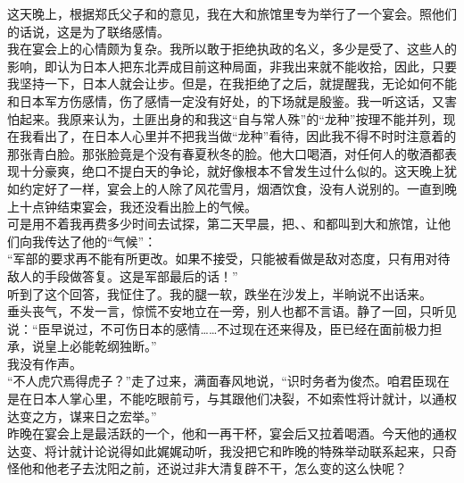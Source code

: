 这天晚上，根据郑氏父子和的意见，我在大和旅馆里专为举行了一个宴会。照他们的话说，这是为了联络感情。\\

我在宴会上的心情颇为复杂。我所以敢于拒绝执政的名义，多少是受了、这些人的影响，即认为日本人把东北弄成目前这种局面，非我出来就不能收拾，因此，只要我坚持一下，日本人就会让步。但是，在我拒绝了之后，就提醒我，无论如何不能和日本军方伤感情，伤了感情一定没有好处，的下场就是殷鉴。我一听这话，又害怕起来。我原来认为，土匪出身的和我这“自与常人殊”的“龙种”按理不能并列，现在我看出了，在日本人心里并不把我当做“龙种”看待，因此我不得不时时注意着的那张青白脸。那张脸竟是个没有春夏秋冬的脸。他大口喝酒，对任何人的敬酒都表现十分豪爽，绝口不提白天的争论，就好像根本不曾发生过什么似的。这天晚上犹如约定好了一样，宴会上的人除了风花雪月，烟酒饮食，没有人说别的。一直到晚上十点钟结束宴会，我还没看出脸上的气候。\\

可是用不着我再费多少时间去试探，第二天早晨，把、、和都叫到大和旅馆，让他们向我传达了他的“气候”：\\

“军部的要求再不能有所更改。如果不接受，只能被看做是敌对态度，只有用对待敌人的手段做答复。这是军部最后的话！”\\

听到了这个回答，我怔住了。我的腿一软，跌坐在沙发上，半晌说不出话来。\\

垂头丧气，不发一言，惊慌不安地立在一旁，别人也都不言语。静了一回，只听见说：“臣早说过，不可伤日本的感情……不过现在还来得及，臣已经在面前极力担承，说皇上必能乾纲独断。”\\

我没有作声。\\

“不人虎穴焉得虎子？”走了过来，满面春风地说，“识时务者为俊杰。咱君臣现在是在日本人掌心里，不能吃眼前亏，与其跟他们决裂，不如索性将计就计，以通权达变之方，谋来日之宏举。”\\

昨晚在宴会上是最活跃的一个，他和一再干杯，宴会后又拉着喝酒。今天他的通权达变、将计就计论说得如此娓娓动听，我没把它和昨晚的特殊举动联系起来，只奇怪他和他老子去沈阳之前，还说过非大清复辟不干，怎么变的这么快呢？\\


